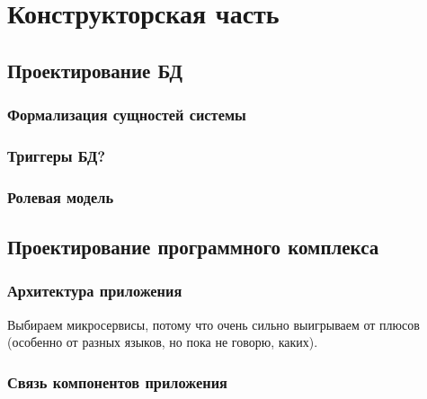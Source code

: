 \section{Конструкторская часть}


\subsection{Проектирование БД}

\subsubsection{Формализация сущностей системы}

\subsubsection{Триггеры БД?}

\subsubsection{Ролевая модель}



\subsection{Проектирование программного комплекса}

\subsubsection{Архитектура приложения}




Выбираем микросервисы, потому что очень сильно выигрываем от плюсов (особенно от разных языков, но пока не говорю, каких).



\subsubsection{Связь компонентов приложения}


